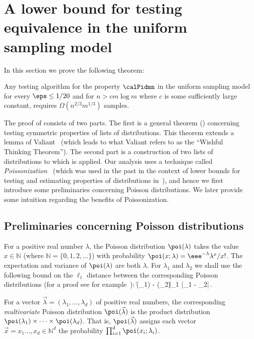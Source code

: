 \section{A lower bound for testing equivalence 
in the uniform sampling model}\label{id-lb.sec}
%
In this section we prove the following theorem:
\begin{theorem}
\label{lb1.thm}
Any testing algorithm for the property  $\calPidmn$  in the uniform sampling model
for every $\eps \leq 1/20$ and for
 $n > c m\log m$ where $c$ is some sufficiently large
constant,
%
%
requires $\Omega(n^{2/3}m^{1/3})$ samples.
%
%
%
%
\end{theorem}
The proof of  consists of two parts. The first
is a general theorem ()
concerning testing  symmetric properties of lists of distributions.
%
%
This theorem extends
 a lemma of Valiant~\cite[Lem. 4.5.4]{valphd}
(which leads to what Valiant refers to as
the ``Wishful Thinking Theorem''). The second part is a construction of
two lists of distributions to which  is applied.
Our analysis uses a technique called \emph{Poissonization}~\cite{szpankowski}
(which was used in the past in the context of lower bounds for testing and estimating
properties of distributions in~\cite{RRSS,val,valphd}),
and hence we first introduce some preliminaries concerning Poisson distributions.
%
We later provide some intuition regarding the benefits of Poissonization.




\subsection{Preliminaries concerning Poisson distributions}
\label{prel-poiss.subsec}
\sloppy
For a positive real number $\lambda$,
the Poisson distribution $\poi(\lambda)$ takes the value
$x \in \mathbb{N}$ (where $\mathbb{N} = \{0,1,2,\ldots\}$) with
probability $\poi(x;\lambda) = \eee^{-\lambda} \lambda^x/x!$.
The expectation and variance of $\poi(\lambda)$ are both $\lambda$.
For $\lambda_1$ and $\lambda_2$ we shall use the following bound
on the $\ell_1$ distance between the corresponding Poisson distributions
(for a proof see for example~\cite[Claim A.2]{RRSS}):
\BEQ
\|\poi(\lambda_1) - \poi(\lambda_2)\|_1 |\lambda_1 - \lambda_2|\,.
\label{poi-stat.eq}
\EEQ

For a vector $\vec{\lambda} = (\lambda_1,\ldots,\lambda_d)$ of positive
real numbers, the corresponding \emph{multivariate} Poisson distribution
$\poi(\vec{\lambda})$ is the product distribution
$\poi(\lambda_1)\times\dots\times \poi(\lambda_d)$. That is,
$\poi(\vec{\lambda})$ assigns each vector
$\vec{x} = x_1\ldots,x_d \in \mathbb{N}^d$ the probability
$\prod_{i=1}^d \poi(x_i;\lambda_i)$.


